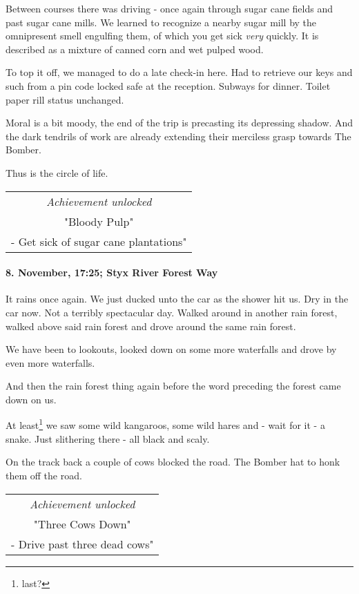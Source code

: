Between courses there was driving - once again through sugar cane fields and past sugar cane mills.
We learned to recognize a nearby sugar mill by the omnipresent smell engulfing them, of which you get sick \emph{very} quickly.
It is described as a mixture of canned corn and wet pulped wood.

To top it off, we managed to do a late check-in here.
Had to retrieve our keys and such from a pin code locked safe at the reception.
Subways for dinner.
Toilet paper rill status unchanged.

Moral is a bit moody, the end of the trip is precasting its depressing shadow.
And the dark tendrils of work are already extending their merciless grasp towards The Bomber.

Thus is the circle of life.

\begin{center}
\begin{tabular}{||c||}
\emph{Achievement unlocked}\\
"Bloody Pulp"\\
\multicolumn{1}{||p{0.8\textwidth}||}{\footnotesize - Get sick of sugar cane plantations"} \\
\end{tabular}
\end{center}

\paragraph{8. November, 17:25; Styx River Forest Way}
It rains once again.
We just ducked unto the car as the shower hit us.
Dry in the car now.
Not a terribly spectacular day.
Walked around in another rain forest, walked above said rain forest and drove around the same rain forest.

We have been to lookouts, looked down on some more waterfalls and drove by even more waterfalls.

And then the rain forest thing again before the word preceding the forest came down on us.

At least\footnote{last?} we saw some wild kangaroos, some wild hares and - wait for it - a snake.
Just slithering there - all black and scaly.

On the track back a couple of cows blocked the road.
The Bomber hat to honk them off the road.

\begin{center}
\begin{tabular}{||c||}
\emph{Achievement unlocked}\\
"Three Cows Down"\\
\multicolumn{1}{||p{0.8\textwidth}||}{\footnotesize - Drive past three dead cows"} \\
\end{tabular}
\end{center}

